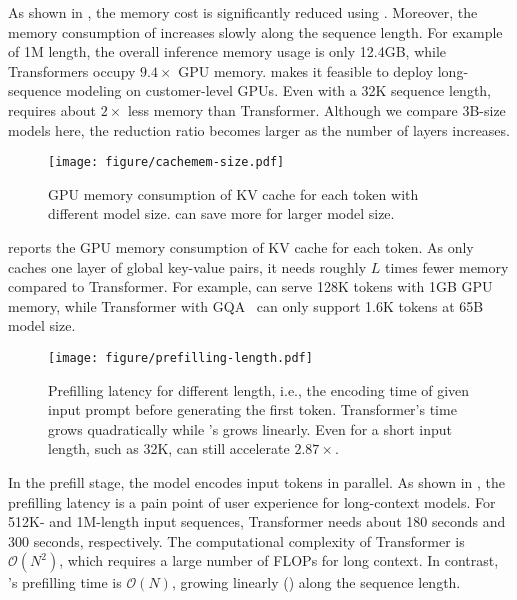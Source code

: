 As shown in , the memory cost is significantly reduced using \our{}.
Moreover, the memory consumption of \our{} increases slowly along the sequence length.
For example of 1M length, the overall inference memory usage is only 12.4GB, while Transformers occupy $9.4\times$ GPU memory.
\our{} makes it feasible to deploy long-sequence modeling on customer-level GPUs.
Even with a 32K sequence length, \our{} requires about $2\times$ less memory than Transformer.
Although we compare 3B-size models here, the reduction ratio becomes larger as the number of layers increases.

\begin{figure*}[t]
\centering
\captionsetup{type=figure}
\texttt{[image: figure/cachemem-size.pdf]}
\caption{GPU memory consumption of KV cache for each token with different model size. \our{} can save more for larger model size.}
\label{fig:cache:mem:per:token}
\end{figure*}

 reports the GPU memory consumption of KV cache for each token.
As \our{} only caches one layer of global key-value pairs, it needs roughly $L$ times fewer memory compared to Transformer.
For example, \our{} can serve 128K tokens with 1GB GPU memory, while Transformer with GQA~\cite{gqa} can only support 1.6K tokens at 65B model size.

\begin{figure*}[t]
\centering
\captionsetup{type=figure}
\texttt{[image: figure/prefilling-length.pdf]}
\caption{Prefilling latency for different length, i.e., the encoding time of given input prompt before generating the first token. Transformer's time grows quadratically while \our{}'s grows linearly.
Even for a short input length, such as 32K, \our{} can still accelerate $2.87\times$.
}
\label{fig:prefilling}
\end{figure*}

In the prefill stage, the model encodes input tokens in parallel.
As shown in , the prefilling latency is a pain point of user experience for long-context models.
For 512K- and 1M-length input sequences, Transformer needs about 180 seconds and 300 seconds, respectively.
The computational complexity of Transformer is $\mathcal{O}(N^2)$, which requires a large number of FLOPs for long context.
In contrast, \our{}'s prefilling time is $\mathcal{O}(N)$, growing linearly () along the sequence length.


